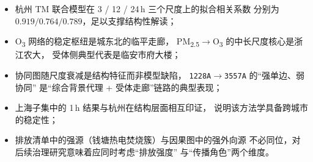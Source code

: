 \documentclass[11pt,a4paper]{article}
\begin{document}
\begin{itemize}[leftmargin=2em]
  \item 杭州 TM 联合模型在 3 / 12 / 24\,h 三个尺度上的拟合相关系数
        分别为 $0.919 / 0.764 / 0.789$，足以支撑结构性解读；
  \item O\textsubscript{3} 网络的稳定枢纽是城东北的临平走廊，
        PM\textsubscript{2.5}$\to$O\textsubscript{3} 的中长尺度核心是浙江农大，
        受体侧典型代表是临安市府大楼；
  \item 协同图随尺度衰减是结构特征而非模型缺陷，
        \texttt{1228A$\to$3557A} 的“强单边、弱协同”
        是“综合背景代理 + 受体走廊”链路的典型表现；
  \item 上海子集中的 1\,h 结果与杭州在结构层面相互印证，
        说明该方法学具备跨城市的稳定性；
  \item 排放清单中的强源（钱塘热电焚烧簇）与因果图中的强外向源
        不必同位，对后续治理研究意味着应同时考虑“排放强度”
        与“传播角色”两个维度。
\end{itemize}
\end{document}
